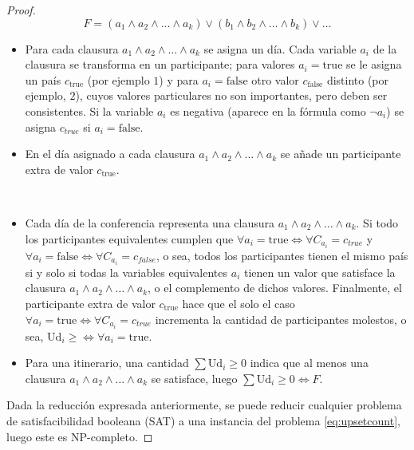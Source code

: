 \begin{proof}
  \begin{equation}
    F=(a_1\land a_2\land\ldots\land a_k)\lor(b_1\land b_2\land \ldots \land b_k)\lor\ldots
  \end{equation}
   \begin{itemize}
    \item Para cada clausura \(a_1\land a_2\land\ldots\land a_k\) se asigna un día. Cada variable \(a_i\) de la clausura se transforma en un participante; para valores \(a_i=\text{true}\) se le asigna un país \(c_{\text{true}}\) (por ejemplo \(1\)) y para \(a_i=\text{false}\) otro valor \(c_{\text{false}}\) distinto (por ejemplo, \(2\)), cuyos valores particulares no son importantes, pero deben ser consistentes. Si la variable \(a_i\) es negativa (aparece en la fórmula como \(\lnot a_i\)) se asigna \(c_{true}\) si \(a_i=\text{false}\).
    \item En el día asignado a cada clausura \(a_1\land a_2\land\ldots\land a_k\) se a\~nade un participante extra de valor \(c_{\text{true}}\).
  \end{itemize}
   \\
   \begin{itemize}
    \item Cada día de la conferencia representa una clausura \(a_1\land a_2\land\ldots\land a_k\). Si todo los participantes equivalentes cumplen que \(\forall a_i=\text{true}\Leftrightarrow\forall C_{a_i}=c_{true}\) y \(\forall a_i=\text{false}\Leftrightarrow\forall C_{a_i}=c_{false}\), o sea, todos los participantes tienen el mismo país si y solo si todas la variables equivalentes \(a_i\) tienen un valor que satisface la clausura \(a_1\land a_2\land\ldots\land a_k\), o el complemento de dichos valores. Finalmente, el participante extra de valor \(c_\text{true}\) hace que el solo el caso \(\forall a_i=\text{true}\Leftrightarrow\forall C_{a_i}=c_{true}\) incrementa la cantidad de participantes molestos, o sea, \(\text{Ud}_i\ge\Leftrightarrow \forall a_i=\text{true}\).
    \item Para una itinerario, una cantidad \(\sum{\text{Ud}_i}\ge0\) indica que al menos una clausura \(a_1\land a_2\land\ldots\land a_k\) se satisface, luego \(\sum{\text{Ud}_i}\ge0\Leftrightarrow F\).
  \end{itemize}
  Dada la reducción expresada anteriormente, se puede reducir cualquier problema de satisfacibilidad booleana (SAT) a una instancia del problema \eqref{eq:upsetcount}, luego este es NP-completo.
\end{proof}
